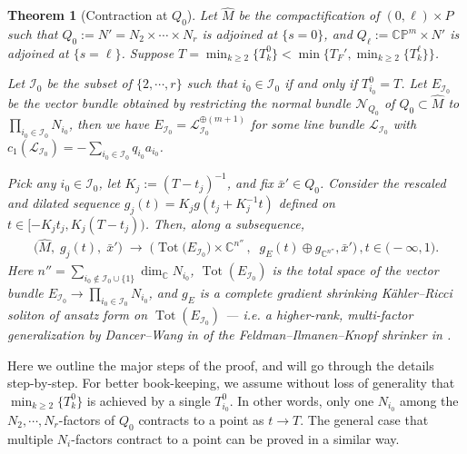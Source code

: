 \documentclass[11pt]{amsart}
\theoremstyle{plain}
\numberwithin{equation}{section}
\newtheorem{theorem}{Theorem}[section]
\theoremstyle{definition}
\theoremstyle{remark}
\begin{document}
\begin{theorem}[Contraction at $Q_0$]
\label{thm:contracting_Q0}
Let $\widehat{M}$ be the compactification of $(0,\ell) \times P$ such that $Q_0 := N' = N_2 \times \cdots \times N_r$ is adjoined at $\{s = 0\}$, and $Q_\ell := \mathbb{CP}^m \times N'$ is adjoined at $\{s = \ell\}$. Suppose
$T = \min_{k \geq 2}\{T_k^0\} < \min\big\{T_F', \min_{k\geq 2}\{T_k^\ell\}\big\}$.

Let $\mathcal{I}_0$ be the subset of $\{2, \cdots, r\}$ such that $i_0 \in \mathcal{I}_0$ if and only if $T_{i_0}^0 = T$. Let $E_{\mathcal{I}_0}$ be the vector bundle obtained by restricting the normal bundle $\mathcal{N}_{Q_0}$ of $Q_0 \subset \widehat{M}$ to $\prod_{i_0 \in \mathcal{I}_0} N_{i_0}$, then we have $E_{\mathcal{I}_0} = \mathcal{L}_{\mathcal{I}_0}^{\oplus ( m + 1 )}$ for some line bundle $\mathcal{L}_{\mathcal{I}_0}$ with $c_1 ( \mathcal{L}_{\mathcal{I}_0} ) = - \sum_{i_0 \in \mathcal{I}_0} q_{i_0} a_{i_0}$.

Pick any $i_0 \in \mathcal{I}_0$, let $K_j := (T-t_j)^{-1}$, and fix $\bar{x}' \in Q_0$. Consider the rescaled and dilated sequence $g_j(t) = K_j g(t_j + K_j^{-1}t)$ defined on $t \in [-K_j t_j, K_j(T-t_j))$. Then, along a subsequence,
\begin{equation}\label{eq:limit_Q0}
\begin{gathered}
\big( \widehat{M}, \; g_j (t), \; \bar{x}' \big) \;\longrightarrow\; \Big( \operatorname{Tot} \big( E_{\mathcal{I}_0} \big) \times \mathbb{C}^{n''} \,, \;\; g_E (t) \oplus g_{\mathbb{C}^{n''}}, \bar{x}'\Big) \,, t \in \big( - \infty, 1 \big).
\end{gathered}
\end{equation}
Here $n'' = \sum_{i_0 \not\in \mathcal{I}_0 \cup \{1\}} \dim_{\mathbb{C}} N_{i_0}$, $\operatorname{Tot} ( E_{\mathcal{I}_0} )$ is the total space of the vector bundle $E_{\mathcal{I}_0} \to \prod_{i_0 \in \mathcal{I}_0} N_{i_0}$, and $g_E$ is a complete gradient shrinking K\"ahler--Ricci soliton of ansatz form on $\operatorname{Tot} ( E_{\mathcal{I}_0} )$ --- i.e. a higher-rank, multi-factor generalization by Dancer--Wang in \cite{DW2011} of the Feldman--Ilmanen--Knopf shrinker in \cite{FIK}.
\end{theorem}

Here we outline the major steps of the proof, and will go through the details step-by-step. For better book-keeping, we assume without loss of generality that $\min_{k \geq 2}\{T_k^0\}$ is achieved by a single $T_{i_0}^0$. In other words, only one $N_{i_0}$ among the $N_2, \cdots, N_r$-factors of $Q_0$ contracts to a point as $t \to T$. The general case that multiple $N_i$-factors contract to a point can be proved in a similar way.
\end{document}
